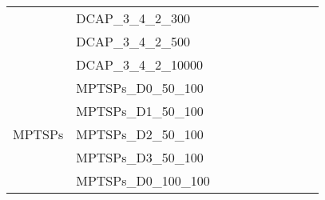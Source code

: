 \begin{table}[]
{\begin{tabular}{|c|l|ll|ll|ll|l|l|}
			& DCAP\_3\_4\_2\_300            &                                   &                                  &                           &                          &                           &                          &                                       &                                \\
			& DCAP\_3\_4\_2\_500            &                                   &                                  &                           &                          &                           &                          &                                       &                                \\
			& DCAP\_3\_4\_2\_10000          &                                   &                                  &                           &                          &                           &                          &                                       &                                \\ \hline
			\multirow{8}{*}{MPTSPs} & MPTSPs\_D0\_50\_100           &                                   &                                  &                           &                          &                           &                          &                                       &                                \\
			& MPTSPs\_D1\_50\_100           &                                   &                                  &                           &                          &                           &                          &                                       &                                \\
			& MPTSPs\_D2\_50\_100           &                                   &                                  &                           &                          &                           &                          &                                       &                                \\
			& MPTSPs\_D3\_50\_100           &                                   &                                  &                           &                          &                           &                          &                                       &                                \\
			& MPTSPs\_D0\_100\_100          &                                   &                                  &                           &                          &                           &                          &                                       &                                \\

\end{tabular}}
\end{table}
